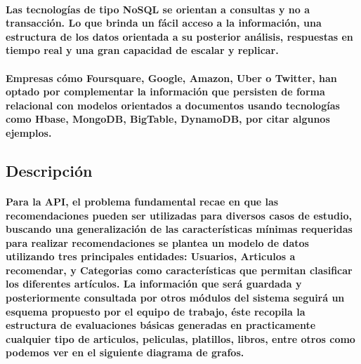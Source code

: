 \paragraph{Las tecnologías de tipo NoSQL se orientan a consultas y no a transacción. Lo que brinda un fácil acceso a la información, una estructura de los datos orientada a su posterior análisis, respuestas en tiempo real y una gran capacidad de escalar y replicar.}

\paragraph{Empresas cómo Foursquare, Google, Amazon, Uber o Twitter, han optado por complementar la información que persisten de forma relacional con modelos orientados a documentos usando tecnologías como Hbase, MongoDB, BigTable, DynamoDB, por citar algunos ejemplos.}

\subsection{Descripción}

\paragraph{Para la API, el problema fundamental recae en que las recomendaciones pueden ser utilizadas para diversos casos de estudio, buscando una generalización de las características mínimas requeridas para realizar recomendaciones se plantea un modelo de datos utilizando tres principales entidades: Usuarios, Articulos a recomendar, y Categorias como características que permitan clasificar los diferentes artículos. La información que será guardada y posteriormente consultada por otros módulos del sistema seguirá un esquema propuesto por el equipo de trabajo, éste recopila la estructura de evaluaciones básicas generadas en practicamente cualquier tipo de articulos, peliculas, platillos, libros, entre otros como podemos ver en el siguiente diagrama de grafos.}

